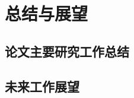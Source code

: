\chapter{总结与展望}
\label{cha:conclusion_futruework}

\section{论文主要研究工作总结}
\label{sec:conclusion}

\section{未来工作展望}
\label{sec:futruework}
